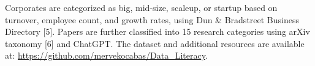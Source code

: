 \documentclass{article}
\begin{document}
Corporates are categorized as big, mid-size, scaleup, or startup based on turnover, employee count, and growth rates, using Dun \& Bradstreet Business Directory [5]. Papers are further classified into 15 research categories using arXiv taxonomy [6] and ChatGPT. The dataset and additional resources are available at: \url{https://github.com/mervekocabas/Data_Literacy}.


\end{document}
